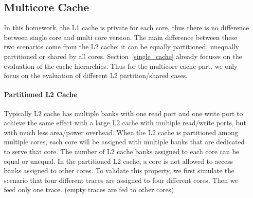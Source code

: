 \documentclass[12pt]{report}
\newcommand{\Sec}[1]{Section~\ref{#1}}
\begin{document}
\subsection{Multicore Cache}
\label{sec:multi_cache}

In this homework, the L1 cache is private for each core, thus there is no difference between single core and multi core version. The main difference between these two scenarios come from the L2 cache: it can be equally partitioned, unequally partitioned or shared by all cores. \Sec{single_cache} already focuses on the evaluation of the cache hierarchies. Thus for the multicore cache part, we only focus on the evaluation of different L2 partition/shared cases.

\paragraph{Partitioned L2 Cache}
Typically L2 cache has multiple banks with one read port and one write port to achieve the same effect with a large L2 cache with multiple read/write ports, but with much less area/power overhead. When the L2 cache is partitioned among multiple cores, each core will be assigned with multiple banks that are dedicated to serve that core. The number of L2 cache banks assigned to each core can be equal or unequal. In the partitioned L2 cache, a core is not allowed to access banks assigned to other cores. To validate this property, we first simulate the scenario that four different traces are assigned to four different cores. Then we feed only one trace. (empty traces are fed to other cores)
\end{document}
